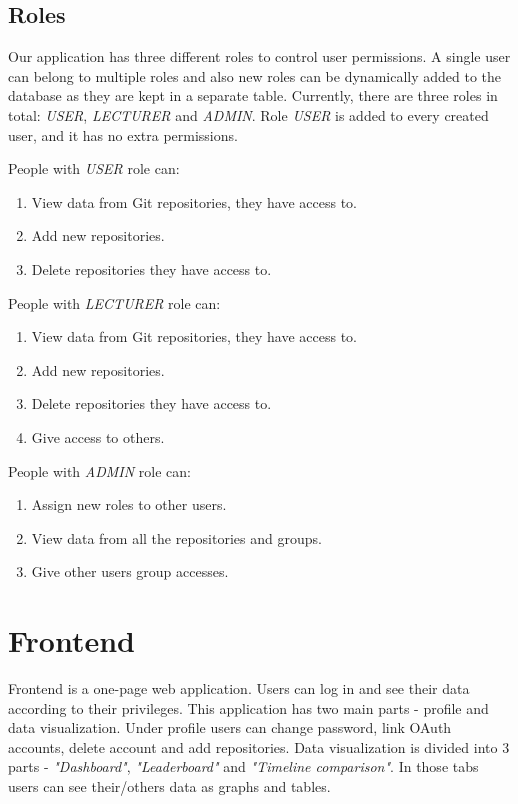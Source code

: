 \subsection{Roles}\label{subsec:roles}
Our application has three different roles to control user permissions.
A single user can belong to multiple roles and also new roles can be dynamically added to the database as they are
kept in a separate table.
Currently, there are three roles in total: \textit{USER}, \textit{LECTURER} and \textit{ADMIN}.
Role \textit{USER} is added to every created user, and it has no extra permissions.

People with \textit{USER} role can:
\begin{enumerate}
    \item View data from Git repositories, they have access to.
    \item Add new repositories.
    \item Delete repositories they have access to.
\end{enumerate}

People with \textit{LECTURER} role can:
\begin{enumerate}
    \item View data from Git repositories, they have access to.
    \item Add new repositories.
    \item Delete repositories they have access to.
    \item Give access to others.
\end{enumerate}

People with \textit{ADMIN} role can:
\begin{enumerate}
    \item Assign new roles to other users.
    \item View data from all the repositories and groups.
    \item Give other users group accesses.
\end{enumerate}

\section{Frontend}\label{sec:frontend-content}
Frontend is a one-page web application.
Users can log in and see their data according to their privileges.
This application has two main parts - profile and data visualization.
Under profile users can change password, link OAuth accounts, delete account and add repositories.
Data visualization is divided into 3 parts - \textit{"Dashboard"}, \textit{"Leaderboard"} and \textit{"Timeline comparison"}.
In those tabs users can see their/others data as graphs and tables.

